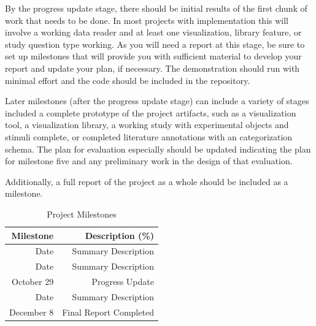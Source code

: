 By the progress update stage, there should be initial results of the first chunk of work that needs to be done.  In most projects with implementation this will involve a working data reader and at least one visualization, library feature, or study question type working. As you will need a report at this stage, be sure to set up milestones that will provide you with sufficient material to develop your report and update your plan, if necessary.   The demonstration should run with minimal effort and the code should be included in the repository.

Later milestones (after the progress update stage) can include a variety of stages included a complete prototype of the project artifacts,  such as a visualization tool, a visualization library, a working study with experimental objects and stimuli complete, or completed literature annotations with an categorization schema. The plan for evaluation especially should be updated indicating the plan for milestone five and any preliminary work in the design of that evaluation.


Additionally, a full report of the project as a whole should be included as a milestone.



\begin{table}[h]
 \caption{Project Milestones}\vspace{1ex} %
 \label{tab:milestones}
 \scriptsize
 \centering %
   \begin{tabular}{r|r}
     Milestone & Description (\%)\\
   \hline
     Date & Summary Description \\
     Date & Summary Description \\
     October 29 & Progress Update \\
     Date & Summary Description \\
     December 8 & Final Report Completed \\
   \end{tabular}
\end{table}

